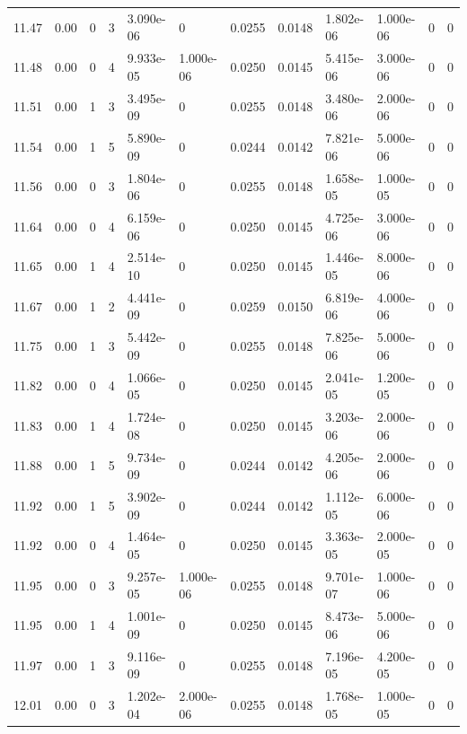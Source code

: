 \documentclass[preview]{standalone}
\begin{document}
{{{{{{{{\begin{tabular}{L{1.2cm}C{1.2cm} C{0.3cm}C{0.5cm} C{1.4cm}C{1.4cm} C{1.4cm}C{1.4cm} C{1.6cm}C{1.6cm} C{1.6cm}C{1.6cm}}
  11.47  &  0.00  & 0     &  3 &  3.090e-06  & 0  &  0.0255&   0.0148& 1.802e-06 & 1.000e-06   &  0 & 0  \\ 
  11.48  &  0.00  & 0     &  4 &  9.933e-05  & 1.000e-06  &  0.0250&   0.0145& 5.415e-06 & 3.000e-06   &  0 & 0  \\ 
  11.51  &  0.00  & 1     &  3 &  3.495e-09  & 0  &  0.0255&   0.0148& 3.480e-06 & 2.000e-06   &  0 & 0  \\ 
  11.54  &  0.00  & 1     &  5 &  5.890e-09  & 0  &  0.0244&   0.0142& 7.821e-06 & 5.000e-06   &  0 & 0  \\ 
  11.56  &  0.00  & 0     &  3 &  1.804e-06  & 0  &  0.0255&   0.0148& 1.658e-05 & 1.000e-05   &  0 & 0  \\ 
  11.64  &  0.00  & 0     &  4 &  6.159e-06  & 0  &  0.0250&   0.0145& 4.725e-06 & 3.000e-06   &  0 & 0  \\ 
  11.65  &  0.00  & 1     &  4 &  2.514e-10  & 0  &  0.0250&   0.0145& 1.446e-05 & 8.000e-06   &  0 & 0  \\ 
  11.67  &  0.00  & 1     &  2 &  4.441e-09  & 0  &  0.0259&   0.0150& 6.819e-06 & 4.000e-06   &  0 & 0  \\ 
  11.75  &  0.00  & 1     &  3 &  5.442e-09  & 0  &  0.0255&   0.0148& 7.825e-06 & 5.000e-06   &  0 & 0  \\ 
  11.82  &  0.00  & 0     &  4 &  1.066e-05  & 0  &  0.0250&   0.0145& 2.041e-05 & 1.200e-05   &  0 & 0  \\ 
  11.83  &  0.00  & 1     &  4 &  1.724e-08  & 0  &  0.0250&   0.0145& 3.203e-06 & 2.000e-06   &  0 & 0  \\ 
  11.88  &  0.00  & 1     &  5 &  9.734e-09  & 0  &  0.0244&   0.0142& 4.205e-06 & 2.000e-06   &  0 & 0  \\ 
  11.92  &  0.00  & 1     &  5 &  3.902e-09  & 0  &  0.0244&   0.0142& 1.112e-05 & 6.000e-06   &  0 & 0  \\ 
  11.92  &  0.00  & 0     &  4 &  1.464e-05  & 0  &  0.0250&   0.0145& 3.363e-05 & 2.000e-05   &  0 & 0  \\ 
  11.95  &  0.00  & 0     &  3 &  9.257e-05  & 1.000e-06  &  0.0255&   0.0148& 9.701e-07 & 1.000e-06   &  0 & 0  \\ 
  11.95  &  0.00  & 1     &  4 &  1.001e-09  & 0  &  0.0250&   0.0145& 8.473e-06 & 5.000e-06   &  0 & 0  \\ 
  11.97  &  0.00  & 1     &  3 &  9.116e-09  & 0  &  0.0255&   0.0148& 7.196e-05 & 4.200e-05   &  0 & 0  \\ 
  12.01  &  0.00  & 0     &  3 &  1.202e-04  & 2.000e-06  &  0.0255&   0.0148& 1.768e-05 & 1.000e-05   &  0 & 0  \\ 

\end{tabular}}}}}}}}}
\end{document}
